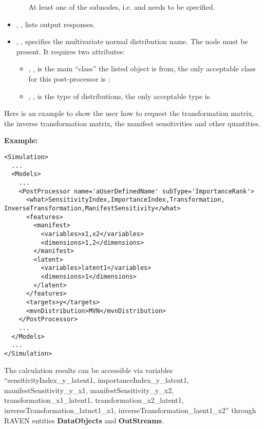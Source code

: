 \begin{itemize}
\begin{itemize}
\begin{itemize}
        \end{itemize}
      \nb At least one of the subnodes, i.e.  and  needs to be specified.
    \end{itemize}
  \item {}, , lists output responses.
  \item {}, , specifies the
  multivariate normal distribution name. The  node must be present. It requires two attributes:
    \begin{itemize}
      \item {}, , is the main
        ``class'' the listed object is from, the only acceptable class for
        this post-processor is ;
      \item {}, , is the type of distributions,
        the only acceptable type is 
    \end{itemize}
\end{itemize}
  Here is an example to show the user how to request the transformation matrix, the inverse transformation matrix, the
  manifest sensitivities and other quantities.

\textbf{Example:}
\begin{lstlisting}[style=XML,morekeywords={name,subType,debug}]
<Simulation>
  ...
  <Models>
    ...
    <PostProcessor name='aUserDefinedName' subType='ImportanceRank'>
      <what>SensitivityIndex,ImportanceIndex,Transformation, InverseTransformation,ManifestSensitivity</what>
      <features>
        <manifest>
          <variables>x1,x2</variables>
          <dimensions>1,2</dimensions>
        </manifest>
        <latent>
          <variables>latent1</variables>
          <dimensions>1</dimensions>
        </latent>
      </features>
      <targets>y</targets>
      <mvnDistribution>MVN</mvnDistribution>
    </PostProcessor>
    ...
  </Models>
  ...
</Simulation>
\end{lstlisting}

The calculation results can be accessible via variables ``sensitivityIndex\_y\_latent1, importanceIndex\_y\_latent1,
manifestSensitivity\_y\_x1, manifestSensitivity\_y\_x2, transformation\_x1\_latent1, transformation\_x2\_latent1,
inverseTransformation\_latnet1\_x1, inverseTransformation\_laent1\_x2'' through RAVEN entities \textbf{DataObjects}
and \textbf{OutStreams}.

